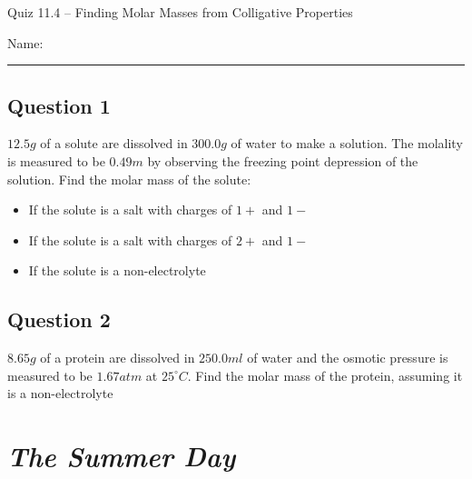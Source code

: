 \documentclass[11pt, letterpaper]{memoir}
\begin{document}
	\begin{center}
		{\large	Quiz 11.4 -- Finding Molar Masses from Colligative Properties}
	\end{center}
	{\large Name: \rule[-1mm]{4in}{.1pt} 
	
	\subsection*{Question 1}
  $12.5g$ of a solute are dissolved in $300.0g$ of water to make a solution. The molality is measured to be $0.49m$ by observing the freezing point depression of the solution. Find the molar mass of the solute:
  \begin{itemize}
    \item If the solute is a salt with charges of $1+$ and $1-$

      \vspace{4em}
    \item If the solute is a salt with charges of $2+$ and $1-$

      \vspace{4em}
    \item If the solute is a non-electrolyte

      \vspace{4em}
  \end{itemize}

	\subsection*{Question 2}
  $8.65g$ of a protein are dissolved in $250.0ml$ of water and the osmotic pressure is measured to be $1.67atm$ at $25^\circ C$. Find the molar mass of the protein, assuming it is a non-electrolyte

	\newpage
	\pagestyle{empty}
	\addtocounter{page}{-1}
  \section*{\emph{The Summer Day}}
}
\end{document}
